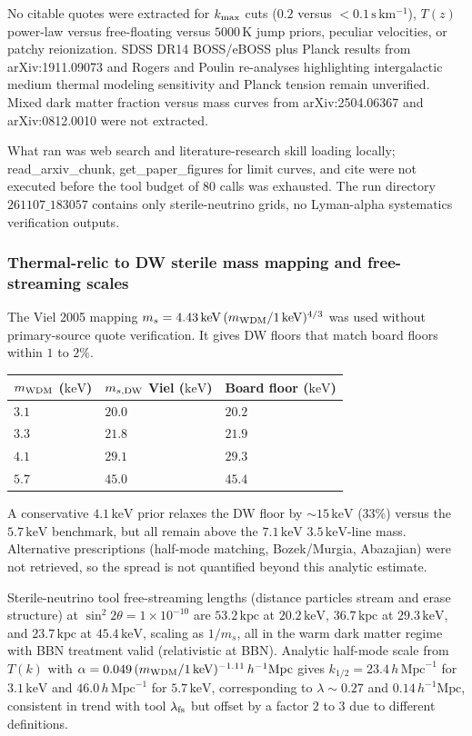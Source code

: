 \documentclass[11pt,a4paper]{article}
\begin{document}
No citable quotes were extracted for $k_{\rm max}$ cuts ($0.2$ versus $<0.1\,\mathrm{s\,km^{-1}}$), $T(z)$ power-law versus free-floating versus $5000\,\mathrm{K}$ jump priors, peculiar velocities, or patchy reionization. SDSS DR14 BOSS/eBOSS plus Planck results from arXiv:1911.09073 and Rogers and Poulin re-analyses highlighting intergalactic medium thermal modeling sensitivity and Planck tension remain unverified. Mixed dark matter fraction versus mass curves from arXiv:2504.06367 and arXiv:0812.0010 were not extracted.

What ran was web search and literature-research skill loading locally; read\_arxiv\_chunk, get\_paper\_figures for limit curves, and cite were not executed before the tool budget of $80$ calls was exhausted. The run directory $261107\_183057$ contains only sterile-neutrino grids, no Lyman-alpha systematics verification outputs.

\subsubsection{Thermal-relic to DW sterile mass mapping and free-streaming scales}
The Viel 2005 mapping $m_s = 4.43\,\mathrm{keV}\,(m_{\rm WDM}/1\,\mathrm{keV})^{4/3}$ was used without primary-source quote verification. It gives DW floors that match board floors within $1$ to $2\%$.

\begin{longtable}{@{}p{}p{}p{}@{}}
\toprule
\textbf{$m_{\rm WDM}$ ($\mathrm{keV}$)} & \textbf{$m_{s,{\rm DW}}$ Viel ($\mathrm{keV}$)} & \textbf{Board floor ($\mathrm{keV}$)} \\ \midrule \endhead
$3.1$ & $20.0$ & $20.2$ \\
$3.3$ & $21.8$ & $21.9$ \\
$4.1$ & $29.1$ & $29.3$ \\
$5.7$ & $45.0$ & $45.4$ \\
\bottomrule\end{longtable}
A conservative $4.1\,\mathrm{keV}$ prior relaxes the DW floor by $\sim 15\,\mathrm{keV}$ ($33\%$) versus the $5.7\,\mathrm{keV}$ benchmark, but all remain above the $7.1\,\mathrm{keV}$ $3.5\,\mathrm{keV}$-line mass. Alternative prescriptions (half-mode matching, Bozek/Murgia, Abazajian) were not retrieved, so the spread is not quantified beyond this analytic estimate.

Sterile-neutrino tool free-streaming lengths (distance particles stream and erase structure) at $\sin^2 2\theta = 1\times10^{-10}$ are $53.2\,\mathrm{kpc}$ at $20.2\,\mathrm{keV}$, $36.7\,\mathrm{kpc}$ at $29.3\,\mathrm{keV}$, and $23.7\,\mathrm{kpc}$ at $45.4\,\mathrm{keV}$, scaling as $1/m_s$, all in the warm dark matter regime with BBN treatment valid (relativistic at BBN). Analytic half-mode scale from $T(k)$ with $\alpha = 0.049\,(m_{\rm WDM}/1\,\mathrm{keV})^{-1.11}\,h^{-1}\mathrm{Mpc}$ gives $k_{1/2} = 23.4\,h\,\mathrm{Mpc}^{-1}$ for $3.1\,\mathrm{keV}$ and $46.0\,h\,\mathrm{Mpc}^{-1}$ for $5.7\,\mathrm{keV}$, corresponding to $\lambda \sim 0.27$ and $0.14\,h^{-1}\mathrm{Mpc}$, consistent in trend with tool $\lambda_{\rm fs}$ but offset by a factor $2$ to $3$ due to different definitions.
\end{document}
